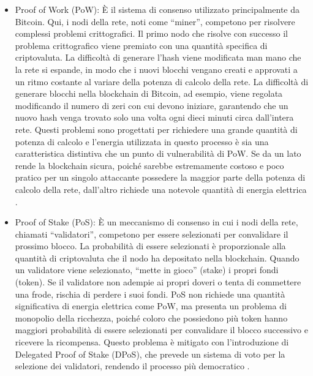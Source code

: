 \begin{itemize}
    \item Proof of Work (PoW): È il sistema di consenso utilizzato principalmente da Bitcoin. Qui, i nodi della rete, 
        noti come “miner”, competono per risolvere complessi problemi crittografici. Il primo nodo che risolve con 
        successo il problema crittografico viene premiato con una quantità specifica di criptovaluta. La difficoltà 
        di generare l’hash viene modificata man mano che la rete si espande, in modo che i nuovi blocchi vengano creati 
        e approvati a un ritmo costante al variare della potenza di calcolo della rete. La difficoltà di generare blocchi 
        nella blockchain di Bitcoin, ad esempio, viene regolata modificando il numero di zeri con cui devono iniziare, 
        garantendo che un nuovo hash venga trovato solo una volta ogni dieci minuti circa dall’intera rete. Questi problemi 
        sono progettati per richiedere una grande quantità di potenza di calcolo e l’energia utilizzata in questo processo 
        è sia una caratteristica distintiva che un punto di vulnerabilità di PoW. Se da un lato rende la blockchain sicura, 
        poiché sarebbe estremamente costoso e poco pratico per un singolo attaccante possedere la maggior parte della potenza 
        di calcolo della rete, dall’altro richiede una notevole quantità di energia elettrica \cite{davidetarpini}.
    
    \item Proof of Stake (PoS): È un meccanismo di consenso in cui i nodi della rete, chiamati “validatori”, competono per 
        essere selezionati per convalidare il prossimo blocco. La probabilità di essere selezionati è proporzionale alla 
        quantità di criptovaluta che il nodo ha depositato nella blockchain. Quando un validatore viene selezionato, 
        “mette in gioco” (stake) i propri fondi (token). Se il validatore non adempie ai propri doveri o tenta di commettere 
        una frode, rischia di perdere i suoi fondi. PoS non richiede una quantità significativa di energia elettrica come PoW, 
        ma presenta un problema di monopolio della ricchezza, poiché coloro che possiedono più token hanno maggiori 
        probabilità di essere selezionati per convalidare il blocco successivo e ricevere la ricompensa. Questo problema è 
        mitigato con l’introduzione di Delegated Proof of Stake (DPoS), che prevede un sistema di voto per la selezione dei 
        validatori, rendendo il processo più democratico \cite{davidetarpini}.
\end{itemize}

